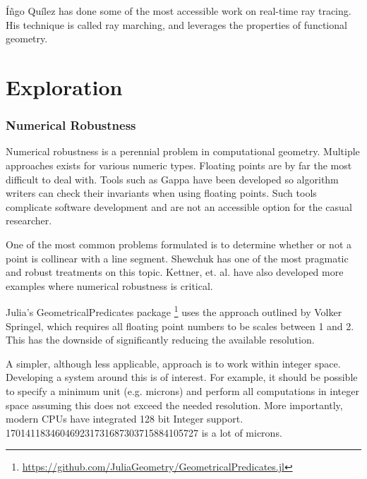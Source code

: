 
Íñgo Quílez has done some of the most accessible work on real-time ray tracing.
His technique is called ray marching, and leverages the properties of functional
geometry.\cite{Quilez_2008}

\section{Exploration}

\cite{Pasko_Adzhiev_Comninos_2008}

\subsubsection{Numerical Robustness}

Numerical robustness is a perennial problem in computational geometry. Multiple
approaches exists for various numeric types. Floating points are by far
the most difficult to deal with. Tools such as Gappa have been developed so
algorithm writers can check their invariants when using floating points. \cite{Gappa}
Such tools complicate software development and are not an accessible option
for the casual researcher.

One of the most common problems formulated is to determine whether or not a
point is collinear with a line segment. Shewchuk has one of the most pragmatic
and robust treatments on this topic.\cite{Shewchuk} Kettner, et. al. have also
developed more examples where numerical robustness is critical. \cite{Kettner_Mehlhorn_Pion_Schirra_Yap_2008}

Julia's GeometricalPredicates package \footnote{\url{https://github.com/JuliaGeometry/GeometricalPredicates.jl}}
uses the approach outlined by Volker Springel, which requires all floating point
numbers to be scales between 1 and 2.\cite{Springel_2010} This has the downside
of significantly reducing the available resolution. 

A simpler, although less applicable, approach is to work
within integer space. Developing a system around this is of interest. For
example, it should be possible to specify a minimum unit (e.g. microns)
and perform all computations in integer space assuming this does not exceed
the needed resolution. More importantly, modern CPUs have integrated 128 bit
Integer support. 170141183460469231731687303715884105727 is a lot of microns.

